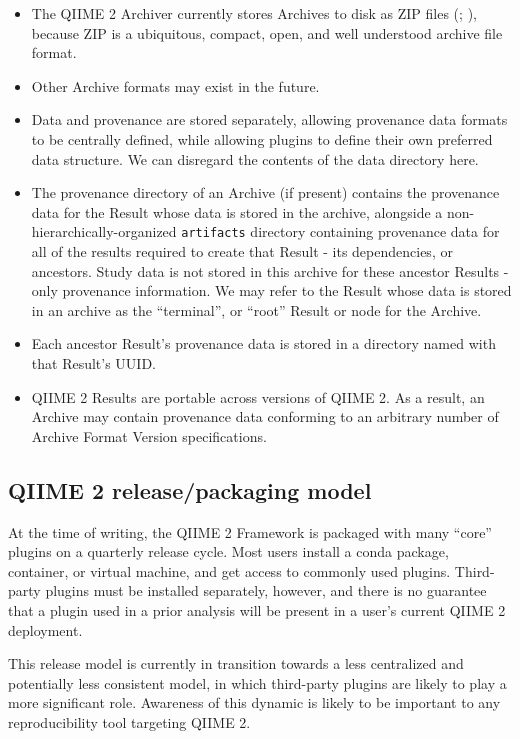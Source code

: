\begin{itemize}
    \item The QIIME 2 Archiver currently stores Archives to disk as ZIP files
        (\cite{noauthor_appnote_nodate}; \cite{iso_isoiec_nodate}), because ZIP is a
        ubiquitous, compact, open, and well understood archive file format.
    \item Other Archive formats may exist in the future.
    \item Data and provenance are stored separately, allowing provenance data
        formats to be centrally defined, while allowing plugins to define their own
        preferred data structure. We can disregard the contents of the data directory here.
    \item The provenance directory of an Archive (if present) contains the
        provenance data for the Result whose data is stored in the archive,
        alongside a non-hierarchically-organized \texttt{artifacts} directory containing
        provenance data for all of the results required to create that Result - its
        dependencies, or ancestors. Study data is not stored in this archive for
        these ancestor Results - only provenance information. We may refer to the
        Result whose data is stored in an archive as the “terminal”, or “root”
        Result or node for the Archive.
    \item Each ancestor Result’s provenance data is stored in a directory named
        with that Result’s UUID.
    \item QIIME 2 Results are portable across versions of QIIME 2. As a result,
        an Archive may contain provenance data conforming to an arbitrary number of
        Archive Format Version specifications.
\end{itemize}

\subsection{QIIME 2 release/packaging model}
At the time of writing, the QIIME 2 Framework is packaged with many “core”
plugins on a quarterly release cycle. Most users install a conda package,
container, or virtual machine, and get access to commonly used plugins.
Third-party plugins must be installed separately, however, and there is no
guarantee that a plugin used in a prior analysis will be present in a user’s
current QIIME 2 deployment.

This release model is currently in transition towards a less centralized and
potentially less consistent model, in which third-party plugins are likely to
play a more significant role. Awareness of this dynamic is likely to be
important to any reproducibility tool targeting QIIME 2.

